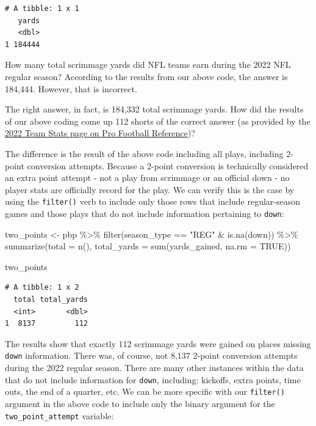 \documentclass[
  letterpaper,
]{krantz}
\newenvironment{Shaded}{\begin{snugshade}}{\end{snugshade}}
\newcommand{\AttributeTok}[1]{\textcolor[rgb]{0.40,0.45,0.13}{#1}}
\newcommand{\ConstantTok}[1]{\textcolor[rgb]{0.56,0.35,0.01}{#1}}
\newcommand{\FunctionTok}[1]{\textcolor[rgb]{0.28,0.35,0.67}{#1}}
\newcommand{\NormalTok}[1]{\textcolor[rgb]{0.00,0.23,0.31}{#1}}
\newcommand{\OtherTok}[1]{\textcolor[rgb]{0.00,0.23,0.31}{#1}}
\newcommand{\SpecialCharTok}[1]{\textcolor[rgb]{0.37,0.37,0.37}{#1}}
\newcommand{\StringTok}[1]{\textcolor[rgb]{0.13,0.47,0.30}{#1}}
\begin{document}
\begin{verbatim}
# A tibble: 1 x 1
   yards
   <dbl>
1 184444
\end{verbatim}

How many total scrimmage yards did NFL teams earn during the 2022 NFL
regular season? According to the results from our above code, the answer
is 184,444. However, that is incorrect.

The right answer, in fact, is 184,332 total scrimmage yards. How did the
results of our above coding come up 112 shorts of the correct answer (as
provided by the
\href{https://www.pro-football-reference.com/years/2022/\#all_team_stats}{2022
Team Stats page on Pro Football Reference})?

The difference is the result of the above code including all plays,
including 2-point conversion attempts. Because a 2-point conversion is
technically considered an extra point attempt - not a play from
scrimmage or an official down - no player stats are officially record
for the play. We can verify this is the case by using the
\texttt{filter()} verb to include only those rows that include
regular-season games and those plays that do not include information
pertaining to \texttt{down}:

\begin{Shaded}
\begin{Highlighting}[]
\NormalTok{two\_points }\OtherTok{\textless{}{-}}\NormalTok{ pbp }\SpecialCharTok{\%\textgreater{}\%}
  \FunctionTok{filter}\NormalTok{(season\_type }\SpecialCharTok{==} \StringTok{"REG"} \SpecialCharTok{\&} \FunctionTok{is.na}\NormalTok{(down)) }\SpecialCharTok{\%\textgreater{}\%}
  \FunctionTok{summarize}\NormalTok{(}\AttributeTok{total =} \FunctionTok{n}\NormalTok{(),}
            \AttributeTok{total\_yards =} \FunctionTok{sum}\NormalTok{(yards\_gained, }\AttributeTok{na.rm =} \ConstantTok{TRUE}\NormalTok{))}

\NormalTok{two\_points}
\end{Highlighting}
\end{Shaded}

\begin{verbatim}
# A tibble: 1 x 2
  total total_yards
  <int>       <dbl>
1  8137         112
\end{verbatim}

The results show that exactly 112 scrimmage yards were gained on places
missing \texttt{down} information. There was, of course, not 8,137
2-point conversion attempts during the 2022 regular season. There are
many other instances within the data that do not include information for
\texttt{down}, including: kickoffs, extra points, time outs, the end of
a quarter, etc. We can be more specific with our \texttt{filter()}
argument in the above code to include only the binary argument for the
\texttt{two\_point\_attempt} variable:
\end{document}
